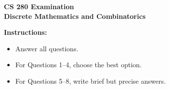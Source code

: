 \documentclass[11pt]{article}
\begin{document}
\begin{center}
  {\Large \textbf{CS 280 Examination}}\\[0.25em]
  {\large \textbf{Discrete Mathematics and Combinatorics}}\\[0.5em]
\end{center}

\noindent\textbf{Instructions:}
\begin{itemize}
  \item Answer all questions.
  \item For Questions 1--4, choose the best option.
  \item For Questions 5--8, write brief but precise answers.
\end{itemize}

\vspace{0.5em}
\end{document}
